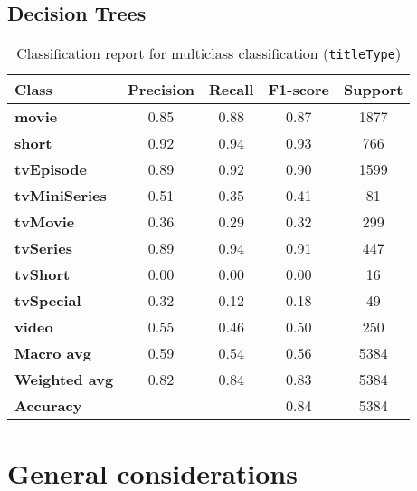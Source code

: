 \subsection*{Decision Trees}
\begin{table}[h!]
    \centering
    \caption{Classification report for multiclass classification (\texttt{titleType})}
    \begin{tabular}{lcccc}
        \toprule
        \bf{Class} & \bf{Precision} & \bf{Recall} & \bf{F1-score} & \bf{Support} \\
        \midrule
        \bf{movie}         & 0.85 & 0.88 & 0.87 & 1877 \\
        \bf{short}         & 0.92 & 0.94 & 0.93 & 766 \\
        \bf{tvEpisode}     & 0.89 & 0.92 & 0.90 & 1599 \\
        \bf{tvMiniSeries}  & 0.51 & 0.35 & 0.41 & 81 \\
        \bf{tvMovie}       & 0.36 & 0.29 & 0.32 & 299 \\
        \bf{tvSeries}      & 0.89 & 0.94 & 0.91 & 447 \\
        \bf{tvShort}       & 0.00 & 0.00 & 0.00 & 16 \\
        \bf{tvSpecial}     & 0.32 & 0.12 & 0.18 & 49 \\
        \bf{video}         & 0.55 & 0.46 & 0.50 & 250 \\
        \midrule
        \bf{Macro avg}     & 0.59 & 0.54 & 0.56 & 5384 \\
        \bf{Weighted avg}  & 0.82 & 0.84 & 0.83 & 5384 \\
        \midrule
        \bf{Accuracy}      &      &      & 0.84 & 5384 \\
        \bottomrule
    \end{tabular}
    \label{tab:multiclass_classification_report}
\end{table}




\section{General considerations}\label{sec:general_considerations}
